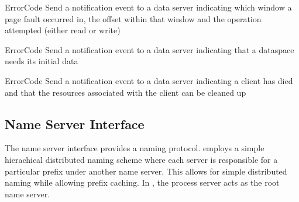 \begin{description}
    \item {}
        {ErrorCode} 
    Send a notification event to a data server indicating which window a page fault occurred in, the offset within that window and the operation attempted (either read or write)

    \item {}
        {ErrorCode}
    Send a notification event to a data server indicating that a dataspace needs its initial data

    \item {}
        {ErrorCode}
    Send a notification event to a data server indicating a client has died and that the resources associated with the client can be cleaned up
  
\end{description}

\subsection{Name Server Interface}

The name server interface provides a naming protocol.  employs a simple hierachical distributed naming scheme where each server is responsible for a particular prefix under another name server. This allows for simple distributed naming while allowing prefix caching. In , the process server acts as the root name server.

